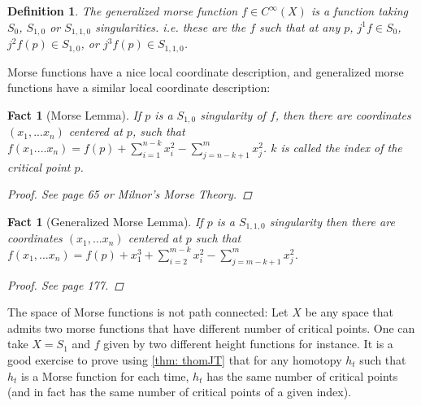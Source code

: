 \documentclass{article}
\newtheorem{fact}[theorem]{Fact}
\newtheorem{definition}[theorem]{Definition}
\newtheorem{proposed work}[theorem]{Proposed Work}
\begin{document}
\begin{definition}
The generalized morse function $f \in C^\infty(X)$ is a function taking $S_0$, $S_{1,0}$ or $S_{1,1,0}$ singularities.  i.e. these are the $f$ such that at any $p$, $j^1f \in S_0$, $j^2f(p) \in S_{1,0}$, or $j^3f(p) \in S_{1,1,0}$.
\end{definition}

Morse functions have a nice local coordinate description, and generalized morse functions have a similar local coordinate description:

\begin{fact}[Morse Lemma]

If $p$ is a $S_{1,0}$ singularity of $f$, then there are coordinates $(x_1,...x_n)$ centered at $p$, such that $f(x_1....x_n)=f(p)+ \sum_{i=1}^{n-k} x_i^2- \sum_{j=n-k+1}^m x_j^2$.  $k$ is called the index of the critical point $p$.

\begin{proof}
See \cite{strata} page 65 or Milnor's Morse Theory.
\end{proof}
\end{fact}

\begin{fact}[Generalized Morse Lemma]
If $p$ is a $S_{1,1,0}$ singularity then there are coordinates $(x_1,...x_n)$ centered at $p$ such that $f(x_1,...x_n)=f(p)+x_1^3+\sum_{i=2}^{m-k} x_i^2 -\sum_{j=m-k+1}^m x_j^2$.
\begin{proof}
See \cite{strata} page 177.  
\end{proof}

\end{fact}

The space of Morse functions is not path connected:  Let $X$ be any space that admits two morse functions that have different number of critical points.  One can take $X=S_1$ and $f$ given by two different height functions for instance.  It is a good exercise to prove using \ref{thm: thomJT} that for any homotopy $h_t$ such that $h_t$ is a Morse function for each time, $h_t$ has the same number of critical points (and in fact has the same number of critical points of a given index).
\end{document}
